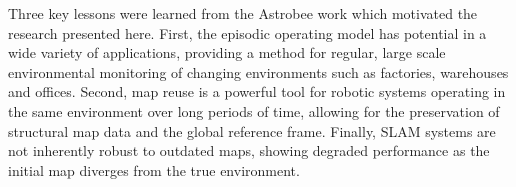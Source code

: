 Three key lessons were learned from the Astrobee work which motivated the research presented here. First, the episodic operating model has potential in a wide variety of applications, providing a method for regular, large scale environmental monitoring of changing environments such as factories, warehouses and offices. Second, map reuse is a powerful tool for robotic systems operating in the same environment over long periods of time, allowing for the preservation of structural map data and the global reference frame. Finally, SLAM systems are not inherently robust to outdated maps, showing degraded performance as the initial map diverges from the true environment.
